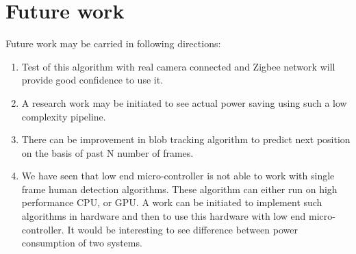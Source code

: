 \section{Future work}
Future work may be carried in following directions:
\begin{enumerate}
\item Test of this algorithm with real camera connected and Zigbee
network will provide good confidence to use it.
\item A research work may be initiated to see actual power saving using
such a low complexity pipeline.
\item There can be improvement in blob tracking algorithm to predict
next position on the basis of past N number of frames.
\item We have seen that low end micro-controller is not able to work with
single frame human detection algorithms. These algorithm can either run on
high performance CPU, or GPU. A work can be initiated to implement such
algorithms in hardware and then to use this hardware with low end
micro-controller. It would be interesting to see difference between power
consumption of two systems.
\end{enumerate}

